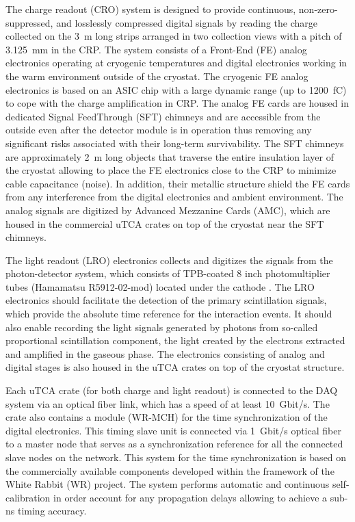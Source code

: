 The charge readout (CRO) system is designed to provide continuous, non-zero-suppressed, and losslessly compressed digital signals by reading the charge collected on the \SI{3}{m} long strips arranged in two collection views with a pitch of \SI{3.125}{mm} in the CRP. The system consists of a Front-End (FE) analog electronics operating at cryogenic temperatures and digital electronics working in the warm environment outside of the cryostat.  The cryogenic FE analog electronics is based on an ASIC chip with a large dynamic range (up to \SI{1200}{fC}) to cope with the charge amplification in CRP. The analog FE cards are housed in dedicated Signal FeedThrough (SFT) chimneys and are accessible from the outside even after the detector module is in operation thus removing any significant risks associated with their long-term survivability. The SFT chimneys are approximately \SI{2}{m} long objects that traverse the entire insulation layer of the cryostat allowing to place the FE electronics close to the CRP to minimize cable capacitance (noise).  In addition, their metallic structure shield the FE cards from any interference from the digital electronics and ambient environment. The analog signals are digitized by Advanced Mezzanine Cards (AMC), which are housed in the commercial uTCA crates on top of the cryostat near the SFT chimneys.

The light readout (LRO) electronics collects and digitizes the signals from the photon-detector system, which consists of TPB-coated \num{8} inch photomultiplier tubes (Hamamatsu R5912-02-mod) located under the cathode . The LRO electronics should facilitate the detection of the primary scintillation signals, which provide the absolute time reference for the interaction events. It should also enable recording the light signals generated by photons from so-called proportional scintillation component, the light created by the electrons extracted and amplified in the gaseous phase. The electronics consisting of analog and digital stages is also housed in the uTCA crates on top of the cryostat structure.

Each uTCA crate (for both charge and light readout) is connected to the DAQ system via an optical fiber link, which has a speed of at least \SI{10}{Gbit/s}. The crate also contains a module (WR-MCH) for the time synchronization of the digital electronics. This timing slave unit is connected via \SI{1}{Gbit/s} optical fiber to a master node that serves as a synchronization reference for all the connected slave nodes on the network. This system for the time synchronization is based on the commercially available components developed within the framework of the White Rabbit (WR) project. The system performs automatic and continuous self-calibration in order account for any propagation delays allowing to achieve a sub-ns timing accuracy.


